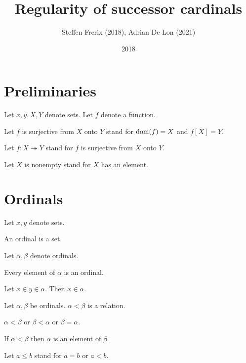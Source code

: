 \documentclass[english]{article}
\title{Regularity of successor cardinals}
\author{Steffen Frerix (2018), Adrian De Lon (2021)}
\date{2018}
\newcommand{\surjects}{\twoheadrightarrow}
\begin{document}
  \maketitle


  \section{Preliminaries}

  \begin{forthel}

    Let $x, y, X, Y$ denote sets.
    Let $f$ denote a function.

    Let $f$ is surjective from $X$ onto $Y$ stand for $\operatorname{dom}(f) = X$ and $f[X] = Y$.

    Let $f : X \surjects Y$ stand for $f$ is surjective from $X$ onto $Y$.

    Let $X$ is nonempty stand for $X$ has an element.
  \end{forthel}


  \section{Ordinals}

  \begin{forthel}
    Let $x, y$ denote sets.

    \begin{signature}
      An ordinal is a set.
    \end{signature}

    Let $\alpha, \beta$ denote ordinals.

    \begin{axiom}
      Every element of $\alpha$ is an ordinal.
    \end{axiom}

    \begin{axiom}\label{Transitivity}
      Let $x \in y \in \alpha$.
      Then $x \in \alpha$.
    \end{axiom}

    \begin{signature}
      Let $\alpha, \beta$ be ordinals.
      $\alpha < \beta$ is a relation.
    \end{signature}

    \begin{axiom}
      $\alpha < \beta$ or $\beta < \alpha$ or $\beta = \alpha$.
    \end{axiom}

    \begin{axiom}
      If $\alpha < \beta$ then $\alpha$ is an element of $\beta$.
    \end{axiom}

    Let $a \leq b$ stand for $a = b$ or $a < b$.
  \end{forthel}
\end{document}
